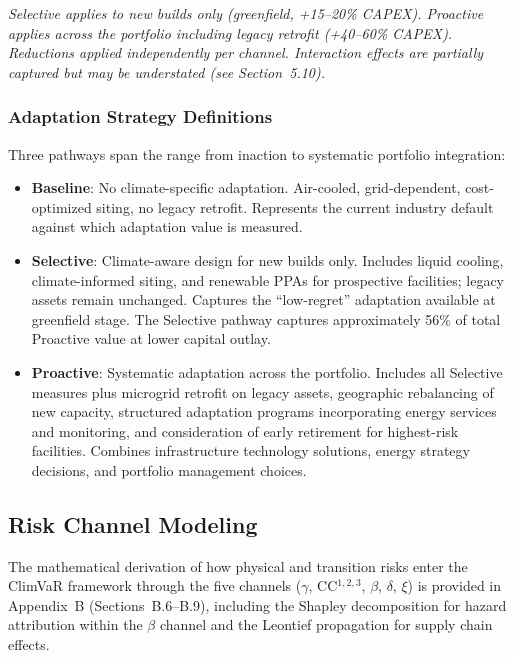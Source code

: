 \small\textit{Selective applies to new builds only (greenfield, +15--20\% CAPEX). Proactive applies across the portfolio including legacy retrofit (+40--60\% CAPEX). Reductions applied independently per channel. Interaction effects are partially captured but may be understated (see Section~5.10).}
\normalsize

\subsubsection{Adaptation Strategy Definitions}

Three pathways span the range from inaction to systematic portfolio integration:

\begin{itemize}
\item \textbf{Baseline}: No climate-specific adaptation. Air-cooled, grid-dependent, cost-optimized siting, no legacy retrofit. Represents the current industry default against which adaptation value is measured.

\item \textbf{Selective}: Climate-aware design for new builds only. Includes liquid cooling, climate-informed siting, and renewable PPAs for prospective facilities; legacy assets remain unchanged. Captures the ``low-regret'' adaptation available at greenfield stage. The Selective pathway captures approximately 56\% of total Proactive value at lower capital outlay.

\item \textbf{Proactive}: Systematic adaptation across the portfolio. Includes all Selective measures plus microgrid retrofit on legacy assets, geographic rebalancing of new capacity, structured adaptation programs incorporating energy services and monitoring, and consideration of early retirement for highest-risk facilities. Combines infrastructure technology solutions, energy strategy decisions, and portfolio management choices.
\end{itemize}



\subsection{Risk Channel Modeling}
\label{app:risk_modeling}

The mathematical derivation of how physical and transition risks enter the ClimVaR framework through the five channels ($\gamma$, CC$^{1,2,3}$, $\beta$, $\delta$, $\xi$) is provided in Appendix~B (Sections~B.6--B.9), including the Shapley decomposition for hazard attribution within the $\beta$ channel and the Leontief propagation for supply chain effects.


